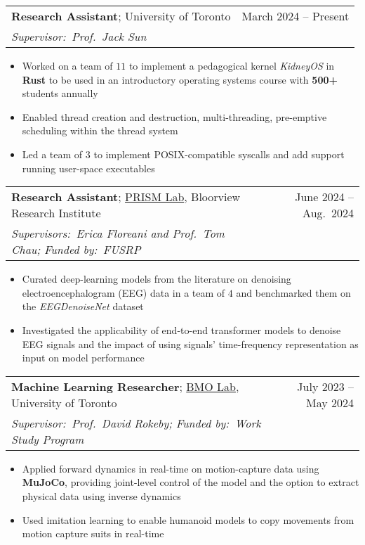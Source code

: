 \documentclass[letterpaper,11pt]{article}
\makeatletter
\newcommand{\resumeItem}[1]{
  \item\small{
    {#1 \vspace{-2pt}}
  }
}
\newcommand{\resumeSubheading}[5]{
  \vspace{-2pt}\item
    \begin{tabular*}{0.97\textwidth}[t]{l@{\extracolsep{\fill}}r}
      \small{\textbf{#1}; {#2}} & \small{#3} \\[-0.05em]
      \emph{\small{#4}} & \textit{\small #5} \\
    \end{tabular*}\vspace{-7pt}
}
\newcommand{\resumeItemListStart}{\begin{itemize}}
\newcommand{\resumeItemListEnd}{\end{itemize}\vspace{-5pt}}
\makeatother
\begin{document}
\resumeSubheading
{Research Assistant}{University of Toronto \href{https://github.com/KidneyOS/KidneyOS}{\footnotesize\faIcon{external-link-alt}}}{\small{March 2024 -- Present}}
{Supervisor:\ Prof.\ Jack Sun}{}
  \resumeItemListStart
  \resumeItem{Worked on a team of $11$ to implement a pedagogical kernel \emph{KidneyOS} in \textbf{Rust} to be used in an introductory operating systems course with \textbf{500+} students annually}
  \resumeItem{Enabled thread creation and destruction, multi-threading, pre-emptive scheduling within the thread system}
  \resumeItem{Led a team of $3$ to implement POSIX-compatible syscalls and add support running user-space executables}
  \resumeItemListEnd

\resumeSubheading
{Research Assistant}{\href{https://hollandbloorview.ca/research-education/bloorview-research-institute/research-centres-labs/prism-lab}{PRISM Lab}, Bloorview Research Institute}{June 2024 -- Aug.\ 2024}
{Supervisors:\ Erica Floreani and Prof.\ Tom Chau; Funded by:\ FUSRP}{}
  \resumeItemListStart
  \resumeItem{Curated deep-learning models from the literature on denoising electroencephalogram (EEG) data in a team of $4$ and benchmarked them on the \emph{EEGDenoiseNet} dataset}
  \resumeItem{Investigated the applicability of end-to-end transformer models to denoise EEG signals and the impact of using signals' time-frequency representation as input on model performance}
  \resumeItemListEnd

\resumeSubheading
{Machine Learning Researcher}{\href{https://bmolab.artsci.utoronto.ca/}{BMO Lab}, University of Toronto \href{https://github.com/ff-zhang/mocap-mujoco}{\footnotesize\faIcon{external-link-alt}}}{July 2023 -- May 2024}
{Supervisor:\ Prof.\ David Rokeby; Funded by:\ Work Study Program}{}
  \resumeItemListStart
  \resumeItem{Applied forward dynamics in real-time on motion-capture data using \textbf{MuJoCo}, providing joint-level control of the model and the option to extract physical data using inverse dynamics}
  \resumeItem{Used imitation learning to enable humanoid models to copy movements from motion capture suits in real-time}
  \resumeItemListEnd
\end{document}
